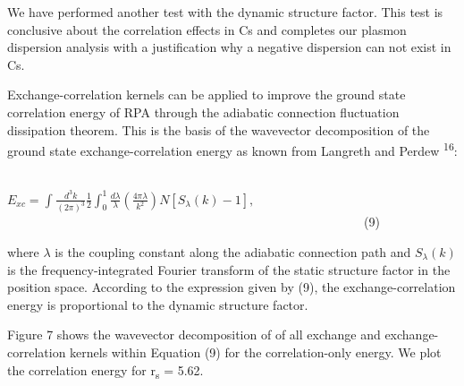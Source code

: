 \documentclass[12pt]{article}
\renewcommand{\_}{\kern-1.5pt\textunderscore\kern-1.5pt}
\begin{document}
\vspace{\baselineskip}
\setlength{\parskip}{9.96pt}
\setlength{\parskip}{0.0pt}
\begin{justify}
We have performed another test with the dynamic structure factor. This test is conclusive about the correlation effects in Cs and completes our plasmon dispersion analysis with a justification why a negative dispersion can not exist in Cs.
\end{justify}\par

\begin{justify}
 Exchange-correlation kernels can be applied to improve the ground state correlation energy of RPA through the adiabatic connection fluctuation dissipation theorem. This is the basis of the wavevector decomposition of the ground state exchange-correlation energy as known from Langreth and Perdew \textsuperscript{16}:
\end{justify}\par


\vspace{\baselineskip}
\setlength{\parskip}{9.96pt}
\setlength{\parskip}{0.0pt}
\begin{Center}
\ \ \ \ \ \ \ \ \ \ \ \ \ \ \ \ \ \ \ \ \ \ \ \ \ \ \ \ \ \ \ \ \ \   \( E_{xc}= \int _{}^{}\frac{d^{3}k}{ \left( 2 \pi  \right) ^{3}}\frac{1}{2} \int _{0}^{1}\frac{d \lambda }{ \lambda } \left( \frac{4 \pi  \lambda }{k^{2}} \right) N \left[ S_{ \lambda } \left( k \right) -1 \right] , \) \ \ \ \ \ \ \ \ \ \ \ \ \ \ \ \ \ \ \ \ \ \ \ \ \ \ \ \ \ \ \ \ \ \ \ \ \ \ \ \ \ \ \ \ \ \ \ \ \ \ \ \ \ \ \ \ \  (9)
\end{Center}\par


\vspace{\baselineskip}
\setlength{\parskip}{9.96pt}
\setlength{\parskip}{0.0pt}
\begin{justify}
where $ \lambda $  is the coupling constant along the adiabatic connection path and  \( S_{ \lambda } \left( k \right)  \)  is the frequency-integrated Fourier transform of the static structure factor in the position space. According to the expression given by (9), the exchange-correlation energy is proportional to the dynamic structure factor.
\end{justify}\par

\begin{justify}
Figure 7 shows the wavevector decomposition of of all exchange and exchange-correlation kernels within Equation (9) for the correlation-only energy. We plot the correlation energy for r\textsubscript{s} = 5.62. 
\end{justify}\par
\end{document}
